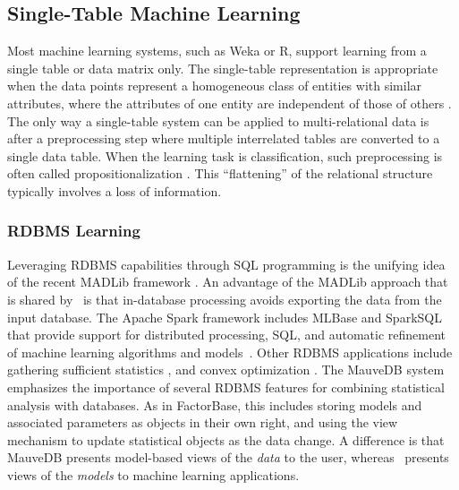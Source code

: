 \subsection{Single-Table Machine Learning} Most machine learning systems, such as Weka or R, support learning from a single table or data matrix only. The single-table representation is appropriate when the data points represent a homogeneous class of entities with similar attributes, where the attributes of one entity are independent of those of others \cite{Kimmig2015}. The only way a single-table system can be applied to multi-relational data is after a preprocessing step where multiple interrelated tables are converted to a single data table. When the learning task is classification, such preprocessing is often called propositionalization  \cite{Kimmig2015}.  This ``flattening'' of the relational structure typically involves a loss of information.  

\subsubsection{RDBMS Learning}
Leveraging RDBMS capabilities through SQL programming 
is the unifying idea of the recent MADLib framework \cite{MADlib_VLDB_2012}. An advantage of the MADLib approach that is shared by \FB\ is that in-database processing avoids exporting the data from the input database. The Apache Spark \cite{Committers} framework includes MLBase and SparkSQL that provide support for distributed processing, SQL, and automatic refinement of machine learning algorithms and models~\cite{MLbase_ICDR_2013}.
Other RDBMS applications include gathering sufficient statistics \cite{Graefe1998}, and convex optimization \cite{Feng_SIGMOD_2012}. The MauveDB system \cite{Deshpande2006} emphasizes the importance of several RDBMS features for combining statistical analysis with databases.
As in {\sc FactorBase}, this includes 
storing models and associated parameters as objects in their own right, 
and using the view mechanism to update statistical objects as the data change.
A difference is that
MauveDB presents model-based views of the {\em data} to the user, whereas \FB\ presents views of the {\em models} to machine learning applications. 

